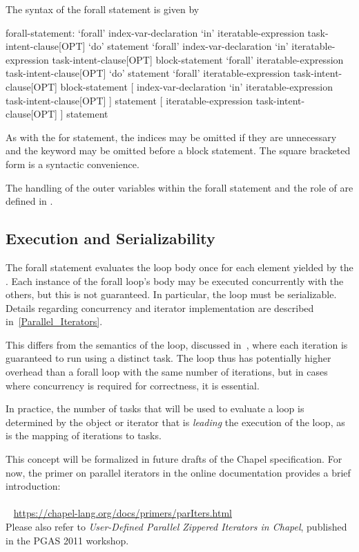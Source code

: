 The syntax of the forall statement is given by
\begin{syntax}
forall-statement:
  `forall' index-var-declaration `in' iteratable-expression task-intent-clause[OPT] `do' statement
  `forall' index-var-declaration `in' iteratable-expression task-intent-clause[OPT] block-statement
  `forall' iteratable-expression task-intent-clause[OPT] `do' statement
  `forall' iteratable-expression task-intent-clause[OPT] block-statement
  [ index-var-declaration `in' iteratable-expression task-intent-clause[OPT] ] statement
  [ iteratable-expression task-intent-clause[OPT] ] statement
\end{syntax}
As with the for statement, the indices may be omitted if they are
unnecessary and the  keyword may be omitted before a block
statement.  The square bracketed form is a syntactic convenience.

The handling of the outer variables within the forall statement and
the role of  are defined in .

\subsection{Execution and Serializability}
\label{forall_semantics}

The forall statement evaluates the loop body once for each element
yielded by the .  Each instance of the
forall loop's body may be executed concurrently with the others, but
this is not guaranteed.  In particular, the loop must be serializable.
Details regarding concurrency and iterator implementation are
described in~\ref{Parallel_Iterators}.

This differs from the semantics of the  loop, discussed
in~, where each iteration is guaranteed to run using a
distinct task.  The  loop thus has potentially higher
overhead than a forall loop with the same number of iterations, but in
cases where concurrency is required for correctness, it is essential.

In practice, the number of tasks that will be used to evaluate
a  loop is determined by the object or iterator that
is \emph{leading} the execution of the loop, as is the mapping of
iterations to tasks.

This concept will be formalized in future drafts of the Chapel
specification. For now, the primer on parallel iterators
in the online documentation provides a brief introduction:
\\ %
\mbox{$$ $$ $$ $$ $$} %
\url{https://chapel-lang.org/docs/primers/parIters.html}
\\
Please also refer to \emph{User-Defined Parallel Zippered Iterators in
Chapel}, published in the PGAS 2011 workshop.

